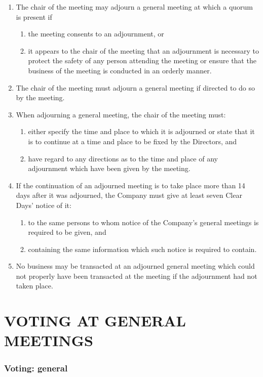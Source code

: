 \documentclass[a4paper,12pt]{article}
\begin{document}
\begin{enumerate}
  \item The chair of the meeting may adjourn a general meeting at which a quorum is present if
  \begin{enumerate}
    \item the meeting consents to an adjournment, or
    \item it appears to the chair of the meeting that an adjournment is necessary to protect the safety of any person attending the meeting or ensure that the business of the meeting is conducted in an orderly manner.
  \end{enumerate}
  \item The chair of the meeting must adjourn a general meeting if directed to do so by the meeting.
  \item When adjourning a general meeting, the chair of the meeting must:
  \begin{enumerate}
    \item either specify the time and place to which it is adjourned or state that it is to continue at a time and place to be fixed by the Directors, and
    \item have regard to any directions as to the time and place of any adjournment which have been given by the meeting.
  \end{enumerate}
  \item If the continuation of an adjourned meeting is to take place more than 14 days after it was adjourned, the Company must give at least seven Clear Days' notice of it:
  \begin{enumerate}
    \item to the same persons to whom notice of the Company's general meetings is required to be given, and
    \item containing the same information which such notice is required to contain.
  \end{enumerate}
  \item No business may be transacted at an adjourned general meeting which could not properly have been transacted at the meeting if the adjournment had not taken place.
\end{enumerate}

\part*{VOTING AT GENERAL MEETINGS}

\section{Voting: general}
\end{document}
